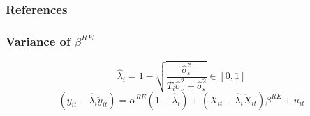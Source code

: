 \documentclass[aspectratio=169,handout]{beamer}
\begin{document}
\theendframe





\begin{frame}[allowframebreaks]
	\frametitle{References}
{
\tiny
{}

}

\bigbreak
{
\tiny {}
}

\end{frame}








\begin{frame}
	\frametitle{Variance of $\beta^{RE}$}\label{fr:varRE}

\begin{equation*}
				\hat{\lambda}_i = 1-\sqrt{\frac{
					\hat{\sigma}_{{\varepsilon}}^2
				}{
					T_i\hat{\sigma}_{{\nu}}^2+\hat{\sigma}_{{\varepsilon}}^2
				} }\in [0,1]
			\end{equation*}
			\begin{equation*}
				\left(y_{it} - \hat{\lambda}_i \ddot{y}_{it}\right)
					= \alpha^{RE}(1-\hat{\lambda}_i)
					+ \left(X_{it}-\hat{\lambda}_i\ddot{X}_{it}\right)\beta^{RE}
					+u_{it}
			\end{equation*}


	\hyperlink{fr:RE_discussion}{}

\end{frame}
\end{document}
